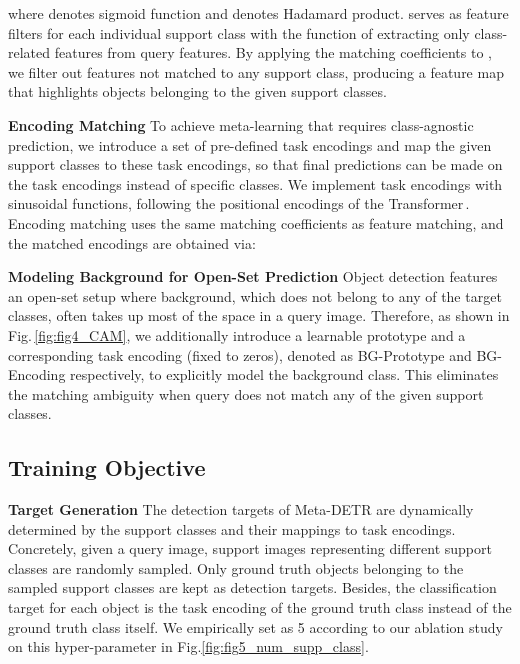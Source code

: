 \documentclass[letterpaper]{article} \usepackage{aaai22}  \usepackage{times}  \usepackage{helvet}  \usepackage{courier}  \usepackage[hyphens]{url}  \usepackage{graphicx} \urlstyle{rm} \def\UrlFont{\rm}  \usepackage{natbib}  \usepackage{caption} \DeclareCaptionStyle{ruled}{labelfont=normalfont,labelsep=colon,strut=off} \frenchspacing  \setlength{\pdfpagewidth}{8.5in}  \setlength{\pdfpageheight}{11in}  \usepackage{algorithm}
\begin{document}
where  denotes sigmoid function and  denotes Hadamard product.  serves as feature filters for each individual support class with the function of extracting only class-related features from query features. By applying the matching coefficients  to , we filter out features not matched to any support class, producing a feature map  that highlights objects belonging to the given support classes.


\smallskip
\vspace{+1.00mm}
\noindent\textbf{Encoding Matching\;\;}
To achieve meta-learning that requires class-agnostic prediction, we introduce a set of pre-defined task encodings and map the given support classes to these task encodings, so that final predictions can be made on the task encodings instead of specific classes. We implement task encodings  with sinusoidal functions, following the positional encodings of the Transformer\,\cite{transformer}. Encoding matching uses the same matching coefficients as feature matching, and the matched encodings  are obtained via:


\smallskip
\noindent\textbf{Modeling Background for Open-Set Prediction\;\;}
Object detection features an open-set setup where background, which does not belong to any of the target classes, often takes up most of the space in a query image. Therefore, as shown in Fig.\,\ref{fig:fig4_CAM}, we additionally introduce a learnable prototype and a corresponding task encoding (fixed to zeros), denoted as BG-Prototype and BG-Encoding respectively, to explicitly model the background class. This eliminates the matching ambiguity when query does not match any of the given support classes.


\subsection{Training Objective} \label{sec:TrainingObjective}

\noindent\textbf{Target Generation\;\;}
The detection targets of Meta-DETR are dynamically determined by the support classes and their mappings to task encodings. Concretely, given a query image,  support images representing different support classes are randomly sampled. Only ground truth objects belonging to the sampled support classes are kept as detection targets. Besides, the classification target for each object is the task encoding of the ground truth class instead of the ground truth class itself. We empirically set  as 5 according to our ablation study on this hyper-parameter in Fig.\;\ref{fig:fig5_num_supp_class}.
\end{document}
